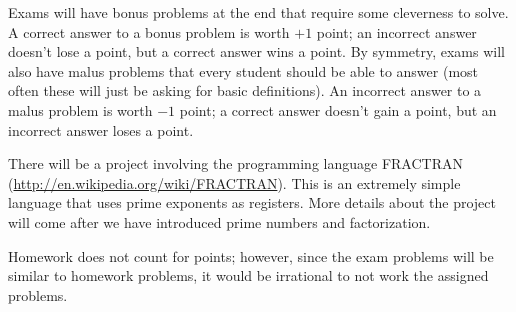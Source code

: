 Exams will have bonus problems at the end that require some cleverness to solve.  A correct answer to a bonus problem is worth $+1$ point; an incorrect answer doesn't lose a point, but a correct answer wins a point.  By symmetry, exams will also have malus problems that every student should be able to answer (most often these will just be asking for basic definitions). An incorrect answer to a malus problem is worth $-1$ point; a correct answer doesn't gain a point, but an incorrect answer loses a point.

There will be a project involving the programming language FRACTRAN (\url{http://en.wikipedia.org/wiki/FRACTRAN}). This is an extremely simple language that uses prime exponents as registers.  More details about the project will come after we have introduced prime numbers and factorization.

Homework does not count for points; however, since the exam problems will be similar to homework problems, it would be irrational to not work the assigned problems.